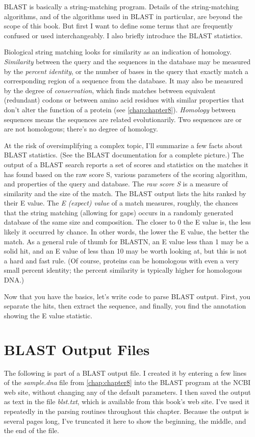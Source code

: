 BLAST is basically a string-matching program. Details of the string-matching algorithms, and of the algorithms used in BLAST in particular, are beyond the scope of this book. But first I want to define some terms that are frequently confused or used interchangeably.  I also briefly introduce the BLAST statistics.

Biological string matching looks for similarity as an indication of homology. \textit{Similarity} between the query and the sequences in the database may be measured by the \textit{percent identity}, or the number of bases in the query that exactly match a corresponding region of a sequence from the database. It may also be measured by the degree of \textit{conservation}, which finds matches between equivalent (redundant) codons or between amino acid residues with similar properties that don't alter the function of a protein (see \autoref{chap:chapter8}). \textit{Homology} between sequences means the sequences are related evolutionarily. Two sequences are or are not homologous; there's no degree of homology.

At the risk of oversimplifying a complex topic, I'll summarize a few facts about BLAST statistics. (See the BLAST documentation for a complete picture.) The output of a BLAST search reports a set of scores and statistics on the matches it has found based on the raw score S, various parameters of the scoring algorithm, and properties of the query and database. The \textit{raw score S} is a measure of similarity and the size of the match. The BLAST output lists the hits ranked by their E value. The \textit{E (expect) value} of a match measures, roughly, the chances that the string matching (allowing for gaps) occurs in a randomly generated database of the same size and composition. The closer to 0 the E value is, the less likely it occurred by chance. In other words, the lower the E value, the better the match. As a general rule of thumb for BLASTN, an E value less than 1 may be a solid hit, and an E value of less than 10 may be worth looking at, but this is not a hard and fast rule. (Of course, proteins can be homologous with even a very small percent identity; the percent similarity is typically higher for homologous DNA.)

Now that you have the basics, let's write code to parse BLAST output. First, you separate the hits, then extract the sequence, and finally, you find the annotation showing the E value statistic. 

\section{BLAST Output Files}
The following is part of a BLAST output file. I created it by entering a few lines of the \textit{sample.dna} file from \autoref{chap:chapter8} into the BLAST program at the NCBI web site, without changing any of the default parameters. I then saved the output as text in the file \textit{blst.txt}, which is available from this book's web site. I've used it repeatedly in the parsing routines throughout this chapter. Because the output is several pages long, I've truncated it here to show the beginning, the middle, and the end of the file. 

